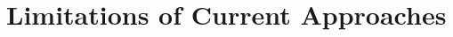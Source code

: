 \section{Limitations of Current Approaches}\label{sec:limitations}

\begin{frame}{\secname}
	\lipsum[1-1]
\end{frame}